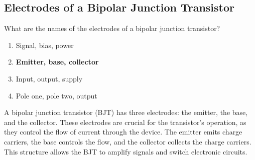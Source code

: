 \subsection{Electrodes of a Bipolar Junction Transistor}
\label{T6B12}

\begin{tcolorbox}[colback=gray!10!white,colframe=black!75!black,title=T6B12]
What are the names of the electrodes of a bipolar junction transistor?
\begin{enumerate}[noitemsep]
    \item Signal, bias, power
    \item \textbf{Emitter, base, collector}
    \item Input, output, supply
    \item Pole one, pole two, output
\end{enumerate}
\end{tcolorbox}

A bipolar junction transistor (BJT) has three electrodes: the emitter, the base, and the collector. These electrodes are crucial for the transistor's operation, as they control the flow of current through the device. The emitter emits charge carriers, the base controls the flow, and the collector collects the charge carriers. This structure allows the BJT to amplify signals and switch electronic circuits.
